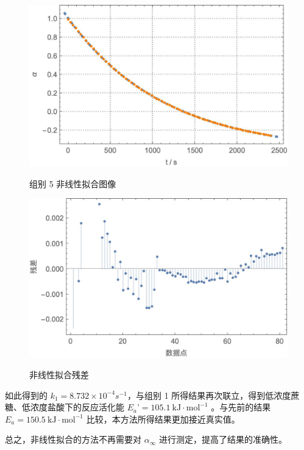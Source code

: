 \documentclass[12pt]{ctexart}
\numberwithin{equation}{section}
\begin{document}
\begin{figure}[!h]
    \begin{minipage}[t]{0.5\linewidth}
        \centering
        \includegraphics[scale=0.45]{nonlinear.jpg}
        \label{fig:nonlinear}
        \caption{组别 5 非线性拟合图像}
    \end{minipage}
    \begin{minipage}[t]{0.5\linewidth}
        \centering
        \includegraphics[scale=0.45]{renonlinear.jpg}
        \label{fig:renonlinear}
        \caption{非线性拟合残差}
    \end{minipage}
    \end{figure}

如此得到的 $k_1 = 8.732\times 10^{-4}s^{-1}$，与组别 1 所得结果再次联立，得到低浓度蔗糖、低浓度盐酸下的反应活化能 $E_a’ = 105.1 ~\mathrm{kJ\cdot mol^{-1}}$ 。与先前的结果 $E_a = 150.5 ~ \mathrm{kJ\cdot mol^{-1}} $ 比较，本方法所得结果更加接近真实值。

总之，非线性拟合的方法不再需要对 $\alpha_{\infty}$ 进行测定，提高了结果的准确性。
\end{document}

